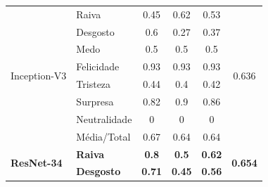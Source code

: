 \begin{table}[]
\begin{tabular}{llcccc}
\multirow{8}{*}{Inception-V3}     & Raiva                 & 0.45                                  & 0.62                                   & 0.53                                  & \multirow{8}{*}{0.636}                \\
                                       & Desgosto              & 0.6                                   & 0.27                                   & 0.37                                  &                                       \\
                                       & Medo                  & 0.5                                   & 0.5                                    & 0.5                                   &                                       \\
                                       & Felicidade            & 0.93                                  & 0.93                                   & 0.93                                  &                                       \\
                                       & Tristeza              & 0.44                                  & 0.4                                    & 0.42                                  &                                       \\
                                       & Surpresa              & 0.82                                  & 0.9                                    & 0.86                                  &                                       \\
                                       & Neutralidade          & 0                                     & 0                                      & 0                                     &                                       \\
                                       & Média/Total           & 0.67                                  & 0.64                                   & 0.64                                  &                                       \\ \hline
\multirow{8}{*}{\textbf{ResNet-34}} & \textbf{Raiva}        & \textbf{0.8}                          & \textbf{0.5}                           & \textbf{0.62}                         & \multirow{8}{*}{\textbf{0.654}}       \\
                                       & \textbf{Desgosto}     & \textbf{0.71}                         & \textbf{0.45}                          & \textbf{0.56}                         &                                       \\

\end{tabular}
\end{table}
